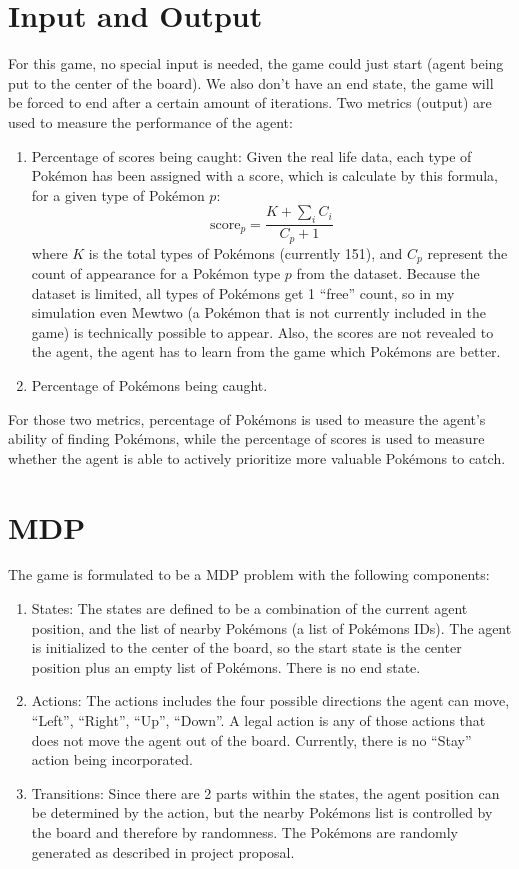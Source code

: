 \documentclass[12pt]{article}
\begin{document}
\section*{Input and Output}
For this game, no special input is needed, the game could
just start (agent being put to the center of the board). We also don't
have an end state, 
the game will be forced
to end after a certain amount of iterations.
Two metrics (output) are used to measure the performance of the agent:
\begin{enumerate}[label=(\alph*)]
    \item Percentage of scores being caught:
    Given the real life data, each type of Pok\'emon has been assigned
    with a score, which is calculate by this formula, for a given type
    of Pok\'emon $p$:
    \[
    \text{score}_{p} = \frac{K + \sum_i C_i}{C_p + 1}
    \]
    where $K$ is the total types of Pok\'emons (currently 151), and 
    $C_p$ represent the count of appearance for a Pok\'emon type $p$
    from the dataset. Because the dataset is limited, 
    all types of Pok\'emons get 1 ``free'' count, 
    so in my simulation even Mewtwo (a Pok\'emon that is not
    currently included in the game) is technically possible
    to appear. Also,
	the scores are not revealed to the agent, the agent has to learn
	from the game which Pok\'emons are better.
    	\item Percentage of Pok\'emons being caught. 

       
\end{enumerate}
For those two metrics, percentage of Pok\'emons is used to
measure the agent's ability of finding Pok\'emons, while
the percentage of scores is used to measure whether the agent
is able to actively prioritize more valuable Pok\'emons to catch. 


\section*{MDP}
The game is formulated to be a MDP problem with the following components:
\begin{enumerate}[label=(\alph*)]
	\item States: The states are defined to be a combination of the current agent
	position, and the list of nearby Pok\'emons (a list of Pok\'emons IDs).
	 The agent is initialized to the center of the
	board, so the start state is the center position plus an empty list of 
	Pok\'emons. There is no end state.
	\item Actions: The actions includes the four possible directions
	the agent can move, 
	``Left'', ``Right'', ``Up'', ``Down''. A legal action is any of
	those actions that does not move the agent out of the board. Currently,
	there is no ``Stay'' action being incorporated.
	\item Transitions: Since there are 2 parts within the states, the 
	agent position can be determined by the action, but the nearby Pok\'emons
	list
	is controlled by the board and therefore by randomness. 
	The Pok\'emons are randomly generated as described in project proposal.

	
	
\end{enumerate}
\end{document}
